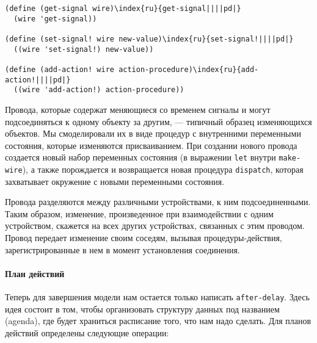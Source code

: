 \begin{Verbatim}[fontsize=\small]
(define (get-signal wire)\index{ru}{get-signal||||pd|}
  (wire 'get-signal))

(define (set-signal! wire new-value)\index{ru}{set-signal!||||pd|}
  ((wire 'set-signal!) new-value))

(define (add-action! wire action-procedure)\index{ru}{add-action!||||pd|}
  ((wire 'add-action!) action-procedure))
\end{Verbatim}

Провода, которые содержат меняющиеся со временем сигналы
и могут подсоединяться к одному объекту за другим, --- типичный
образец изменяющихся объектов.  Мы смоделировали их в виде
процедур с внутренними переменными состояния, которые изменяются
присваиванием.  При создании нового провода создается новый набор
переменных состояния (в выражении {\tt let} внутри
{\tt make-wire}), а также порождается и возвращается новая
процедура {\tt dispatch}, которая захватывает окружение с
новыми переменными состояния.

Провода разделяются между различными устройствами, к ним
подсоединенными.  Таким образом, изменение, произведенное при
взаимодействии с одним устройством, скажется на всех других
устройствах, связанных с этим проводом.  Провод передает изменение
своим соседям, вызывая процедуры-действия, зарегистрированные в нем в
момент установления соединения.

\paragraph{План действий}


Теперь для завершения модели нам остается только написать
{\tt after-delay}.  Здесь идея состоит в том, чтобы
организовать структуру данных под названием
 (agenda), где будет
храниться расписание того, что нам надо сделать.  Для планов действий
определены следующие операции:



